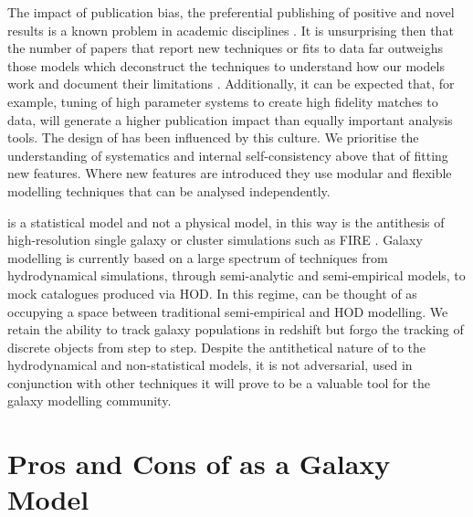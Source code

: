 The impact of publication bias, the preferential publishing of positive and novel results is a known problem in academic disciplines \cite[e.g.][]{Song2010DisseminationBiases}. It is unsurprising then that the number of papers that report new techniques or fits to data far outweighs those models which deconstruct the techniques to understand how our models work and document their limitations \cite[e.g.][]{vandenBosch2017DissectingSimulation, vandenBosch2018DisruptionFiction, Asquith2018CosmicModels}. Additionally, it can be expected that, for example, tuning of high parameter systems to create high fidelity matches to data, will generate a higher publication impact than equally important analysis tools. The design of \steel has been influenced by this culture. We prioritise the understanding of systematics and internal self-consistency above that of fitting new features. Where new features are introduced they use modular and flexible modelling techniques that can be analysed independently.


\steel is a statistical model and not a physical model, in this way is the antithesis of high-resolution single galaxy or cluster simulations such as FIRE \cite{Hopkins2018FIRE-2Formation}. Galaxy modelling is currently based on a large spectrum of techniques from hydrodynamical simulations, through semi-analytic and semi-empirical models, to mock catalogues produced via HOD. In this regime, \steel can be thought of as occupying a space between traditional semi-empirical and HOD modelling. We retain the ability to track galaxy populations in redshift but forgo the tracking of discrete objects from step to step. Despite the antithetical nature of \steel to the hydrodynamical and non-statistical models, it is not adversarial, used in conjunction with other techniques it will prove to be a valuable tool for the galaxy modelling community. 

\section{Pros and Cons of \steel as a Galaxy Model}

